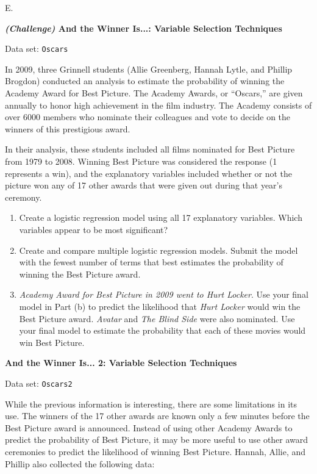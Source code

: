 \documentclass[
]{report}
\newcounter{excount}
\renewcommand{\theexcount}{E\arabic{excount}}
\begin{document}
\begin{list}{\theexcount.}{ \setlength{\itemsep}{1.2em}}
  \item \textbf{\textit{(Challenge)} And the Winner Is...: Variable Selection Techniques}

Data set: \texttt{Oscars}

In 2009, three Grinnell students (Allie Greenberg, Hannah Lytle, and Phillip Brogdon) conducted an analysis to estimate the probability of winning the Academy Award for Best Picture. The Academy Awards, or “Oscars,” are given annually to honor high achievement in the film industry. The Academy consists of over 6000 members who nominate their colleagues and vote to decide on the winners of this prestigious award.

In their analysis, these students included all films nominated for Best Picture from 1979 to 2008. Winning Best Picture was considered the response (1 represents a win), and the explanatory variables included whether or not the picture won any of 17 other awards that were given out during that year’s ceremony.

  \begin{enumerate}
    \item Create a logistic regression model using all 17 explanatory variables. Which variables appear to be most significant?
    \item Create and compare multiple logistic regression models. Submit the model with the fewest number of terms that best estimates the probability of winning the Best Picture award.
    \item \textit{Academy Award for Best Picture in 2009 went to \textit{Hurt Locker}}. Use your final model in Part (b) to predict the likelihood that \textit{Hurt Locker} would win the Best Picture award. \textit{Avatar} and \textit{The Blind Side} were also nominated. Use your final model to estimate the probability that each of these movies would win Best Picture.
  \end{enumerate}

  \item \textbf{And the Winner Is... 2: Variable Selection Techniques}

Data set: \texttt{Oscars2}

While the previous information is interesting, there are some limitations in its use. The winners of the 17 other awards are known only a few minutes before the Best Picture award is announced. Instead of using other Academy Awards to predict the probability of Best Picture, it may be more useful to use other award ceremonies to predict the likelihood of winning Best Picture. Hannah, Allie, and Phillip also collected the following data:


\end{list}
\end{document}
